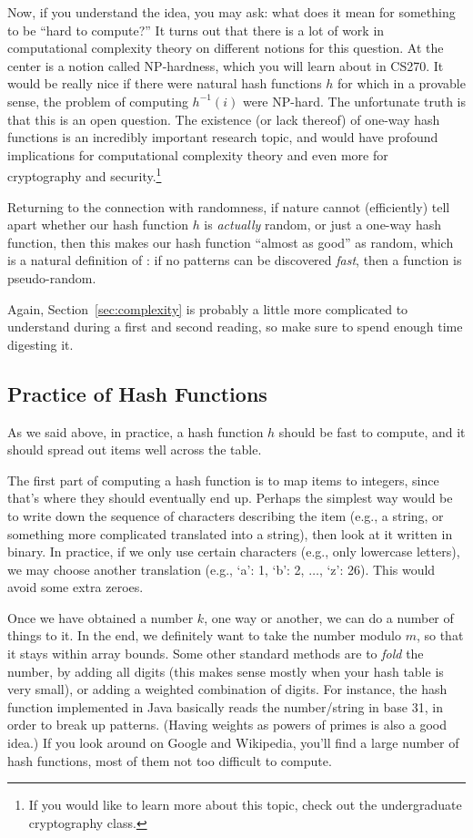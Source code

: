 Now, if you understand the idea, you may ask: what does it mean for
something to be ``hard to compute?''
It turns out that there is a lot of work in computational complexity
theory on different notions for this question.
At the center is a notion called NP-hardness, which you will learn
about in CS270. It would be really nice if there were natural
hash functions $h$ for which in a provable sense, the problem of
computing $h^{-1}(i)$ were NP-hard. 
The unfortunate truth is that this is an open question. 
The existence (or lack thereof) of one-way hash functions is an
incredibly important research topic, and would have profound
implications for computational complexity theory and even more for
cryptography and security.\footnote{If you would like to learn more
  about this topic, check out the undergraduate cryptography class.}

Returning to the connection with randomness, if nature cannot
(efficiently) tell apart whether our hash function $h$ is
\emph{actually} random, or just a one-way hash function, then this
makes our hash function ``almost as good'' as random, which is a
natural definition of : if no patterns can be
discovered \emph{fast}, then a function is pseudo-random.

Again, Section~\ref{sec:complexity} is probably a little more
complicated to understand during a first and second reading, so make
sure to spend enough time digesting it. 

\subsection{Practice of Hash Functions}
As we said above, in practice, a hash function $h$ should be fast to
compute, and it should spread out items well across the table.

The first part of computing a hash function is to map items to
integers, since that's where they should eventually end up.
Perhaps the simplest way would be to write down the sequence of
characters describing the item (e.g., a string, or something more
complicated translated into a string), then look at it written in
binary. In practice, if we only use certain characters (e.g., only
lowercase letters), we may choose another translation (e.g., 
`a': 1, `b': 2, $\ldots$, `z': 26). This would avoid some extra
zeroes.

Once we have obtained a number $k$, one way or another, we can do a
number of things to it. In the end, we definitely want to take the
number modulo $m$, so that it stays within array bounds.
Some other standard methods are to \emph{fold} the number, by adding
all digits (this makes sense mostly when your hash table is very
small), or adding a weighted combination of digits.
For instance, the hash function implemented in Java basically reads
the number/string in base 31, in order to break up patterns. (Having
weights as powers of primes is also a good idea.) If you look around
on Google and Wikipedia, you'll find a large number of hash functions,
most of them not too difficult to compute.

